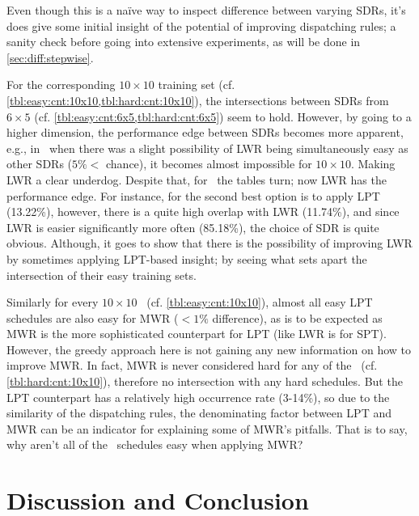 Even though this is a na\"ive way to inspect difference between varying SDRs, it's does give some initial insight of the potential of improving dispatching rules; a sanity check before going into extensive experiments, as will be done in \cref{sec:diff:stepwise}.

For the corresponding $10\times10$ training set (cf. \cref{tbl:easy:cnt:10x10,tbl:hard:cnt:10x10}), the intersections between SDRs from $6\times5$ (cf. \cref{tbl:easy:cnt:6x5,tbl:hard:cnt:6x5}) seem to hold. 
However, by going to a higher dimension, the performance edge between SDRs becomes more apparent, e.g., in \JSP\ when there was a slight possibility of LWR being simultaneously easy as other SDRs ($5\%<$ chance), it becomes almost impossible for $10\times10$. 
Making LWR a clear underdog. 
Despite that, for \FSP\ the tables turn; now LWR has the performance edge. 
For instance, for  the second  best option is to apply LPT 
(13.22\%), however, there is a quite high overlap with LWR (11.74\%), and since 
LWR is easier significantly more often (85.18\%), the choice of SDR is quite 
obvious. 
Although, it goes to show that there is the possibility of improving LWR by sometimes applying LPT-based insight; by seeing what sets apart the intersection of their easy training sets. 

Similarly for every $10\times10$ \JSP\ (cf. \cref{tbl:easy:cnt:10x10}), almost all easy LPT schedules are also easy  for MWR ($<1\%$ difference), as is to be expected as MWR is the more sophisticated counterpart for LPT (like LWR is for SPT). 
However, the greedy approach here is  not gaining any new information on how to improve MWR. 
In fact, MWR is never considered hard for any of the \JSP\ (cf. \cref{tbl:hard:cnt:10x10}), therefore no intersection with any hard schedules. 
But the LPT counterpart has a relatively high occurrence rate (3-14\%), so due to the similarity of the dispatching rules, the denominating factor between LPT and MWR can be an indicator for explaining some of MWR's pitfalls.
That is to say, why aren't all of the \jsp\ schedules easy when applying MWR? 

{\setlength{\tabcolsep}{3pt} 
    
    
    
    
    
}

\clearpage
\section{Discussion and Conclusion}

